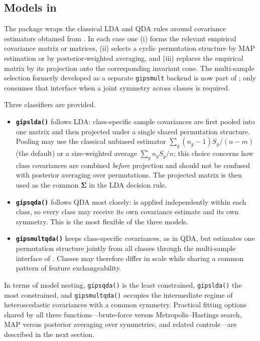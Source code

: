 \subsection{\texorpdfstring{Models in }{Models in }}\label{models-in}

The package wraps the classical LDA and QDA rules around covariance estimators obtained from . In each case one (i) forms the relevant empirical covariance matrix or matrices, (ii) selects a cyclic permutation structure by MAP estimation or by posterior-weighted averaging, and (iii) replaces the empirical matrix by its projection onto the corresponding invariant cone. The multi-sample selection formerly developed as a separate \texttt{gipsmult} backend is now part of ;  only consumes that interface when a joint symmetry across classes is required.

Three classifiers are provided.

\begin{itemize}
\tightlist
\item
  \textbf{\texttt{gipslda()}} follows LDA: class-specific sample covariances are first pooled into one matrix and then projected under a single shared permutation structure. Pooling may use the classical unbiased estimator \(\sum_g(n_g-1)S_g/(n-m)\) (the default) or a size-weighted average \(\sum_g n_g S_g/n\); this choice concerns how class covariances are combined \emph{before} projection and should not be confused with posterior averaging over permutations. The projected matrix is then used as the common \(\boldsymbol{\Sigma}\) in the LDA decision rule.
\item
  \textbf{\texttt{gipsqda()}} follows QDA most closely:  is applied independently within each class, so every class may receive its own covariance estimate and its own symmetry. This is the most flexible of the three models.
\item
  \textbf{\texttt{gipsmultqda()}} keeps class-specific covariances, as in QDA, but estimates one permutation structure jointly from all classes through the multi-sample interface of . Classes may therefore differ in scale while sharing a common pattern of feature exchangeability.
\end{itemize}

In terms of model nesting, \texttt{gipsqda()} is the least constrained, \texttt{gipslda()} the most constrained, and \texttt{gipsmultqda()} occupies the intermediate regime of heteroscedastic covariances with a common symmetry. Practical fitting options shared by all three functions---brute-force versus Metropolis--Hastings search, MAP versus posterior averaging over symmetries, and related controls---are described in the next section.

